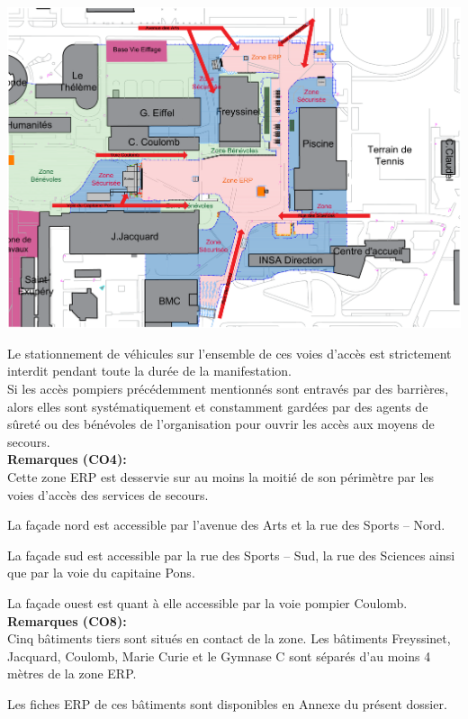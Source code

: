 \documentclass[hidelinks, paper=a4, fontsize=13pt]{report}
\begin{document}
\begin{center}
	\includegraphics[width=.8\textwidth,keepaspectratio]{Exports/Plan_24h_45eme-Acces_Pompiers}
\end{center}

Le stationnement de véhicules sur l’ensemble de ces voies d’accès est strictement interdit pendant toute la durée de la manifestation. \\

Si les accès pompiers précédemment mentionnés sont entravés par des barrières, alors elles sont systématiquement et constamment gardées par des agents de sûreté ou des bénévoles de l’organisation pour ouvrir les accès aux moyens de secours.\\

\textbf{Remarques (CO4): }\\
Cette zone ERP est desservie sur au moins la moitié de son périmètre par les voies d’accès des services de secours. 

La façade nord est accessible par l’avenue des Arts et la rue des Sports – Nord. 

La façade sud est accessible par la rue des Sports – Sud, la rue des Sciences ainsi que par la voie du capitaine Pons. 

La façade ouest est quant à elle accessible par la voie pompier Coulomb.\\


\textbf{Remarques (CO8): }\\
Cinq bâtiments tiers sont situés en contact de la zone. Les bâtiments Freyssinet, Jacquard, Coulomb, Marie Curie et le Gymnase C sont séparés d’au moins 4 mètres de la zone ERP. 

Les fiches ERP de ces bâtiments sont disponibles en Annexe du présent dossier. 
\end{document}
